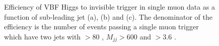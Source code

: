 \begin{figure}
  \caption{Efficiency of VBF Higgs to invisible trigger in single muon data as a function of sub-leading jet \pt (a), \Mjj (b) and \detajj (c). The denominator of the efficiency is the number of events passing a single muon trigger which have two jets with \pt$> 80$ \GeV, $M_{jj}>600$ \GeV and \detajj$> 3.6$ \GeV.}
  \label{fig:run2othereffs}
\end{figure}


